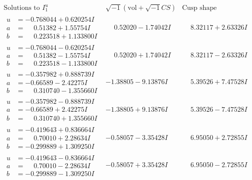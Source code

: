 \documentclass[1p]{elsarticle_modified}
\theoremstyle{definition}
\newcommand{\I}{\sqrt{-1}}
\begin{document}
$$\begin{array}{c|c|c}  
\text{Solutions to }I^u_{1}& \I (\text{vol} + \sqrt{-1}CS) & \text{Cusp shape}\\
 \hline 
\begin{aligned}
u &= -0.768044 + 0.620254 I \\
a &= \phantom{-}0.51382 + 1.55754 I \\
b &= \phantom{-}0.223518 + 1.133800 I\end{aligned}
 & \phantom{-}0.52020 - 1.74042 I & \phantom{-}8.32117 + 2.63326 I \\ \hline\begin{aligned}
u &= -0.768044 - 0.620254 I \\
a &= \phantom{-}0.51382 - 1.55754 I \\
b &= \phantom{-}0.223518 - 1.133800 I\end{aligned}
 & \phantom{-}0.52020 + 1.74042 I & \phantom{-}8.32117 - 2.63326 I \\ \hline\begin{aligned}
u &= -0.357982 + 0.888739 I \\
a &= -0.66589 - 2.42275 I \\
b &= \phantom{-}0.310740 - 1.355660 I\end{aligned}
 & -1.38805 - 9.13876 I & \phantom{-}5.39526 + 7.47528 I \\ \hline\begin{aligned}
u &= -0.357982 - 0.888739 I \\
a &= -0.66589 + 2.42275 I \\
b &= \phantom{-}0.310740 + 1.355660 I\end{aligned}
 & -1.38805 + 9.13876 I & \phantom{-}5.39526 - 7.47528 I \\ \hline\begin{aligned}
u &= -0.419643 + 0.836664 I \\
a &= \phantom{-}0.70010 + 2.28634 I \\
b &= -0.299889 + 1.309250 I\end{aligned}
 & -0.58057 - 3.35428 I & \phantom{-}6.95050 + 2.72855 I \\ \hline\begin{aligned}
u &= -0.419643 - 0.836664 I \\
a &= \phantom{-}0.70010 - 2.28634 I \\
b &= -0.299889 - 1.309250 I\end{aligned}
 & -0.58057 + 3.35428 I & \phantom{-}6.95050 - 2.72855 I \\ \hline\begin{aligned}

\end{aligned}
\end{array}$$
\end{document}
